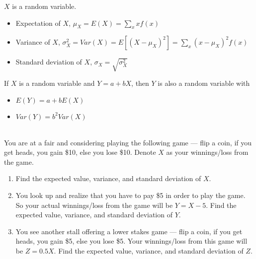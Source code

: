 \documentclass{./../handout}
\begin{document}
\thispagestyle{plain}
\begin{center}
\end{center}	
$X$ is a random variable. \vspace{-1em}
\begin{itemize}
  \item Expectation of $X$, $\mu_X = E(X) = \sum_{x} x f(x) $
  \item Variance of $X$, $\sigma^2_X = Var(X) = E[(X-\mu_X)^2] = \sum_{x} (x-\mu_X)^2 f(x) $
  \item Standard deviation of $X$, $\sigma_X = \sqrt{\sigma_X^2}$
\end{itemize}
If $X$ is a random variable and $Y=a+bX$, then $Y$ is also a random variable with \vspace{-1em}
\begin{itemize}
\item $ E(Y) = a + b E(X)$ 
\item $Var(Y) = b^2 Var(X) $ \\~\\
\end{itemize}

You are at a fair and considering playing the following game --- flip a coin, if you get heads, you gain \$10, else you lose \$10. Denote $X$ as your winnings/loss from the game.
  \begin{enumerate}
  \item Find the expected value, variance, and standard deviation of $X$.  \\ \vspace{10cm} 
  
  \item You look up and realize that you have to pay \$5 in order to play the game. So your actual winnings/loss from the game will be $Y=X-5$. Find the expected value, variance, and standard deviation of $Y$. \\ \vspace{9cm} 
   
  \item You see another stall offering a lower stakes game --- flip a coin, if you get heads, you gain \$5, else you lose \$5. Your winnings/loss from this game will be $Z=0.5X$. Find the expected value, variance, and standard deviation of $Z$. 
  \end{enumerate}
\end{document}
